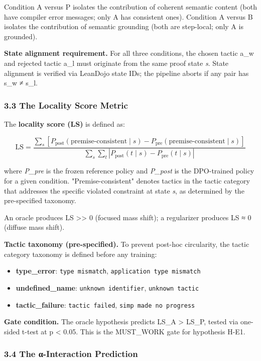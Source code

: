 Condition A versus P isolates the contribution of coherent semantic content (both have compiler error messages; only A has consistent ones). Condition A versus B isolates the contribution of semantic grounding (both are step-local; only A is grounded).

\textbf{State alignment requirement.} For all three conditions, the chosen tactic a_w and rejected tactic a_l must originate from the same proof state \textit{s}. State alignment is verified via LeanDojo state IDs; the pipeline aborts if any pair has s_w ≠ s_l.

\subsubsection{3.3 The Locality Score Metric}

The \textbf{locality score (LS)} is defined as:

$$\text{LS} = \frac{\sum_s \left[ P_{\text{post}}(\text{premise-consistent} \mid s) - P_{\text{pre}}(\text{premise-consistent} \mid s) \right]}{\sum_s \sum_t \left| P_{\text{post}}(t \mid s) - P_{\text{pre}}(t \mid s) \right|}$$

where \textit{P_pre} is the frozen reference policy and \textit{P_post} is the DPO-trained policy for a given condition. "Premise-consistent" denotes tactics in the tactic category that addresses the specific violated constraint at state \textit{s}, as determined by the pre-specified taxonomy.

An oracle produces LS >> 0 (focused mass shift); a regularizer produces LS ≈ 0 (diffuse mass shift).

\textbf{Tactic taxonomy (pre-specified).} To prevent post-hoc circularity, the tactic category taxonomy is defined before any training:
\begin{itemize}
\item \textbf{type_error}: \texttt{type mismatch}, \texttt{application type mismatch}
\item \textbf{undefined_name}: \texttt{unknown identifier}, \texttt{unknown tactic}
\item \textbf{tactic_failure}: \texttt{tactic failed}, \texttt{simp made no progress}
\end{itemize}

\textbf{Gate condition.} The oracle hypothesis predicts LS_A > LS_P, tested via one-sided t-test at p < 0.05. This is the MUST_WORK gate for hypothesis H-E1.

\subsubsection{3.4 The α-Interaction Prediction}

